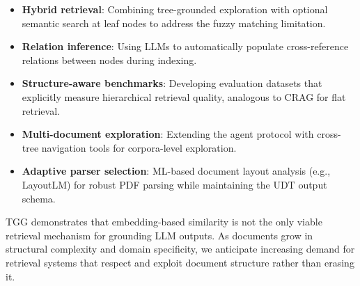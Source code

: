 \documentclass[conference]{IEEEtran}
\begin{document}
\begin{itemize}
    \item \textbf{Hybrid retrieval}: Combining tree-grounded exploration with optional semantic search at leaf nodes to address the fuzzy matching limitation.
    \item \textbf{Relation inference}: Using LLMs to automatically populate cross-reference relations between nodes during indexing.
    \item \textbf{Structure-aware benchmarks}: Developing evaluation datasets that explicitly measure hierarchical retrieval quality, analogous to CRAG for flat retrieval.
    \item \textbf{Multi-document exploration}: Extending the agent protocol with cross-tree navigation tools for corpora-level exploration.
    \item \textbf{Adaptive parser selection}: ML-based document layout analysis (e.g., LayoutLM) for robust PDF parsing while maintaining the UDT output schema.
\end{itemize}

TGG demonstrates that embedding-based similarity is not the only viable retrieval mechanism for grounding LLM outputs. As documents grow in structural complexity and domain specificity, we anticipate increasing demand for retrieval systems that respect and exploit document structure rather than erasing it.

\balance


\end{document}
